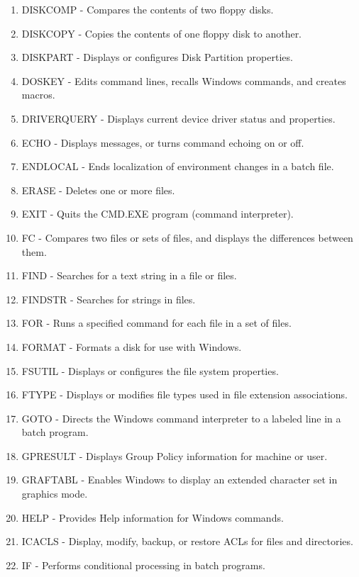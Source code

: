 \documentclass[11pt,a4paper,twoside]{article}
\begin{document}
\begin{enumerate}
\item DISKCOMP       	-	Compares the contents of two floppy disks.
\item DISKCOPY       	-	Copies the contents of one floppy disk to another.
\item DISKPART       	-	Displays or configures Disk Partition properties.
\item DOSKEY         	-	Edits command lines, recalls Windows commands, and creates macros.
\item DRIVERQUERY    	-	Displays current device driver status and properties.
\item ECHO           	-	Displays messages, or turns command echoing on or off.
\item ENDLOCAL       	-	Ends localization of environment changes in a batch file.
\item ERASE          	-	Deletes one or more files.
\item EXIT           	-	Quits the CMD.EXE program (command interpreter).
\item FC             	-	Compares two files or sets of files, and displays the differences between them.
\item FIND           	-	Searches for a text string in a file or files.
\item FINDSTR        	-	Searches for strings in files.
\item FOR            	-	Runs a specified command for each file in a set of files.
\item FORMAT         	-	Formats a disk for use with Windows.
\item FSUTIL         	-	Displays or configures the file system properties.
\item FTYPE          	-	Displays or modifies file types used in file extension associations.
\item GOTO           	-	Directs the Windows command interpreter to a labeled line in a batch program.
\item GPRESULT       	-	Displays Group Policy information for machine or user.
\item GRAFTABL       	-	Enables Windows to display an extended character set in graphics mode.
\item HELP           	-	Provides Help information for Windows commands.
\item ICACLS         	-	Display, modify, backup, or restore ACLs for files and directories.
\item IF             	-	Performs conditional processing in batch programs.

\end{enumerate}
\end{document}
